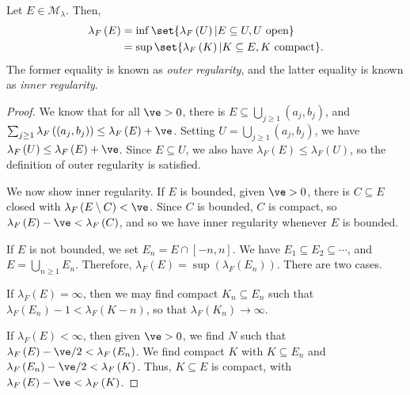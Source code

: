\documentclass[10pt]{mypackage}
\begin{document}
\begin{theorem}
  Let $E\in \mathcal{M}_{\lambda}$. Then,
  \begin{align*}
    \lambda_F\left( E \right) &= \inf\set{\lambda_F\left( U \right) | E\subseteq U,U\text{ open}}\\
                              &= \sup\set{\lambda_F\left( K \right) | K\subseteq E,K\text{ compact}}.
  \end{align*}
  The former equality is known as \textit{outer regularity}, and the latter equality is known as \textit{inner regularity}.
\end{theorem}
\begin{proof}
  We know that for all $\ve > 0$, there is $E\subseteq \bigcup_{j\geq 1}\left( a_j,b_j \right)$, and $\sum_{j\geq 1}\lambda_F\left( \left( a_j,b_j \right) \right) \leq \lambda_F\left( E \right) + \ve$. Setting $U = \bigcup_{j\geq 1}\left( a_j,b_j \right)$, we have $\lambda_F\left( U \right) \leq \lambda_F\left( E \right) + \ve$. Since $E\subseteq U$, we also have $\lambda_F\left( E \right) \leq \lambda_F\left( U \right)$, so the definition of outer regularity is satisfied.\newline

  We now show inner regularity. If $E$ is bounded, given $\ve > 0$, there is $C\subseteq E$ closed with $\lambda_F\left( E\setminus C \right) < \ve$. Since $C$ is bounded, $C$ is compact, so $\lambda_F\left( E \right) - \ve < \lambda_F\left( C \right)$, and so we have inner regularity whenever $E$ is bounded.\newline

  If $E$ is not bounded, we set $E_n = E\cap \left[ -n,n \right]$. We have $E_1\subseteq E_2\subseteq \cdots$, and $E = \bigcup_{n\geq 1}E_n$. Therefore, $\lambda_F\left( E \right) = \sup\left( \lambda_F\left( E_n \right) \right)$. There are two cases.\newline

  If $\lambda_F\left( E \right) = \infty$, then we may find compact $K_n\subseteq E_n$ such that $\lambda_F\left( E_n \right) - 1 < \lambda_F\left( K-n \right)$, so that $\lambda_F\left( K_n \right)\rightarrow \infty$.\newline

  If $\lambda_F\left( E \right) < \infty$, then given $\ve > 0$, we find $N$ such that $\lambda_F\left( E \right) - \ve / 2 < \lambda_F\left( E_n \right)$. We find compact $K$ with $K\subseteq E_n$ and $\lambda_F\left( E_n \right) - \ve/2 < \lambda_F\left( K \right)$. Thus, $K\subseteq E$ is compact, with $\lambda_F\left( E \right) - \ve < \lambda_F\left( K \right)$.
\end{proof}
\end{document}
